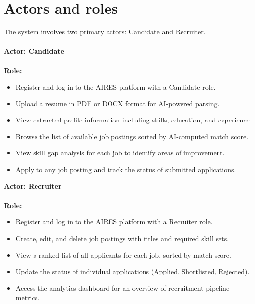   \section{Actors and roles}
  The system involves two primary actors: Candidate and Recruiter.\\\\
\noindent
\textbf{Actor: Candidate}
\\\\
 \textbf{Role:}
 \begin{itemize}
    \item Register and log in to the AIRES platform with a Candidate role.
    \item Upload a resume in PDF or DOCX format for AI-powered parsing.
    \item View extracted profile information including skills, education, and experience.
    \item Browse the list of available job postings sorted by AI-computed match score.
    \item View skill gap analysis for each job to identify areas of improvement.
    \item Apply to any job posting and track the status of submitted applications.
 \end{itemize}
\noindent
\textbf{Actor: Recruiter}
\\\\
\textbf{Role:}
\begin{itemize}
    \item Register and log in to the AIRES platform with a Recruiter role.
    \item Create, edit, and delete job postings with titles and required skill sets.
    \item View a ranked list of all applicants for each job, sorted by match score.
    \item Update the status of individual applications (Applied, Shortlisted, Rejected).
    \item Access the analytics dashboard for an overview of recruitment pipeline metrics.
\end{itemize}
  